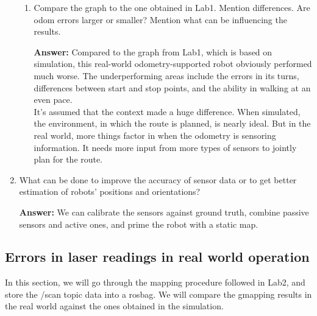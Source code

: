 \documentclass[12pt]{article}
\begin{document}
\begin{enumerate}
\begin{enumerate}
        \item Compare the graph to the one obtained in Lab1. Mention differences. Are odom errors larger or smaller? Mention what can be influencing the results.
        
        \textbf{Answer: }Compared to the graph from Lab1, which is based on simulation, this real-world odometry-supported robot obviously performed much worse. The underperforming areas include the errors in its turns, differences between start and stop points, and the ability in walking at an even pace.
        \\It's assumed that the context made a huge difference. When simulated, the environment, in which the route is planned, is nearly ideal. But in the real world, more things factor in when the odometry is sensoring information. It needs more input from more types of sensors to jointly plan for the route.
    
    \end{enumerate}

    \item What can be done to improve the accuracy of sensor data or to get better estimation of robots' positions and orientations?
    
    \textbf{Answer: }We can calibrate the sensors against ground truth, combine passive sensors and active ones, and prime the robot with a static map.

\end{enumerate}


\subsection{Errors in laser readings in real world operation}
In this section, we will go through the mapping procedure followed in Lab2, and store the /scan topic data into a rosbag. We will compare the gmapping results in the real world against the ones obtained in the simulation.
\end{document}
